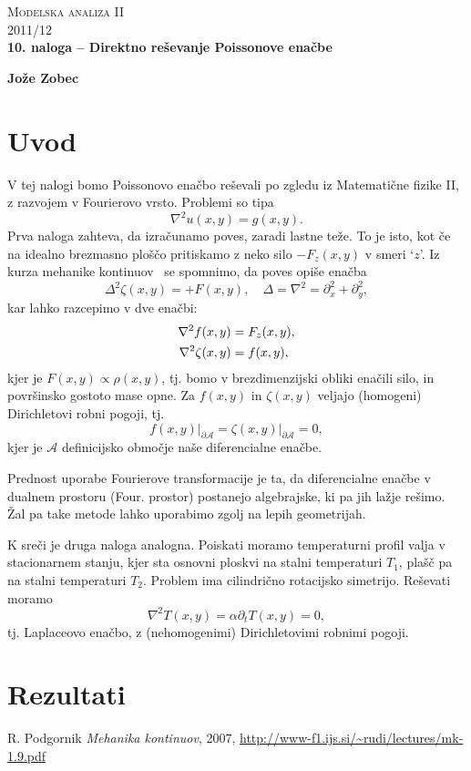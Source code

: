 \documentclass[a4 paper, 12pt]{article}
\begin{document}
\begin{center}
\textsc{Modelska analiza II}\\
\textsc{2011/12}\\[0.5cm]
\textbf{10. naloga -- Direktno re\v sevanje Poissonove ena\v cbe}
\end{center}
\begin{flushright}
\textbf{Jože Zobec}\\
\end{flushright}

\section{Uvod}

V tej nalogi bomo Poissonovo ena\v cbo re\v sevali po zgledu iz Matemati\v cne fizike II, z razvojem v Fourierovo
vrsto. Problemi so tipa
\[
	\nabla^2 u (x,y) = g (x,y).
\]
Prva naloga zahteva, da izra\v cunamo poves, zaradi lastne te\v ze. To je isto, kot \v ce na idealno brezmasno
plo\v s\v co pritiskamo z neko silo $-F_z(x,y)$ v smeri `$z$'. Iz kurza mehanike kontinuov~\cite[str.~84]{podgornik}
se spomnimo, da poves opi\v se ena\v cba
\[
	\Delta^2 \zeta (x,y) = +F(x,y), \quad \Delta = \nabla^2 = \partial_x^2 + \partial_y^2,
\]
kar lahko razcepimo v dve ena\v cbi:
\begin{align}
	\nabla^2 f (x, y) &= F_z (x,y), \notag \\
	\nabla^2 \zeta (x,y) &= f (x,y),
\end{align}
kjer je $F (x,y) \propto \rho (x,y)$, tj. bomo v brezdimenzijski obliki ena\v cili silo, in povr\v sinsko gostoto
mase opne. Za $f(x,y)$ in $\zeta(x,y)$ veljajo (homogeni) Dirichletovi robni pogoji, tj.
\[
	f(x,y)\Big|_{\partial \mathcal{A}} = \zeta(x,y)\Big|_{\partial \mathcal{A}} = 0,
\]
kjer je $\mathcal{A}$ definicijsko obmo\v cje na\v se diferencialne ena\v cbe.

Prednost uporabe Fourierove transformacije je ta, da diferencialne ena\v cbe v dualnem prostoru (Four. prostor)
postanejo algebrajske, ki pa jih la\v zje re\v simo. \v Zal pa take metode lahko uporabimo zgolj na lepih
geometrijah.

K sre\v ci je druga naloga analogna. Poiskati moramo temperaturni profil valja v stacionarnem stanju, kjer sta
osnovni ploskvi na stalni temperaturi $T_1$, pla\v s\v c pa na stalni temperaturi $T_2$. Problem ima cilindri\v cno
rotacijsko simetrijo. Re\v sevati moramo
\[
	\nabla^2 T (x,y) = \alpha \partial_t T(x,y) = 0,
\]
tj. Laplaceovo ena\v cbo, z (nehomogenimi) Dirichletovimi robnimi pogoji.

\section{Rezultati}

\begin{thebibliography}{9}
		R. Podgornik
		{\em Mehanika kontinuov},
		2007,
		\url{http://www-f1.ijs.si/~rudi/lectures/mk-1.9.pdf}
\end{thebibliography}
\end{document}
